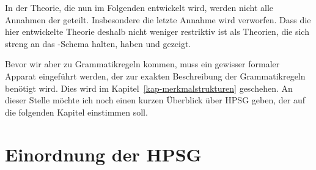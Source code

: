 In der Theorie, die nun im Folgenden entwickelt wird, werden nicht alle Annahmen
der \xbart geteilt. Insbesondere die letzte Annahme wird verworfen. Dass die
hier entwickelte Theorie deshalb nicht weniger restriktiv ist als Theorien,
die sich streng an das \xbar-Schema halten, haben \citet{Pullum85a} und \citet{KP90a}
gezeigt.

Bevor wir aber zu Grammatikregeln kommen, muss ein gewisser formaler Apparat eingeführt
werden, der zur exakten Beschreibung der Grammatikregeln benötigt wird. Dies wird
im Kapitel~\ref{kap-merkmalstrukturen} geschehen. An dieser Stelle möchte
ich noch einen kurzen Überblick über HPSG geben, der auf die folgenden Kapitel einstimmen soll.





\section{Einordnung der HPSG}
\label{sec-grundlegendes}


